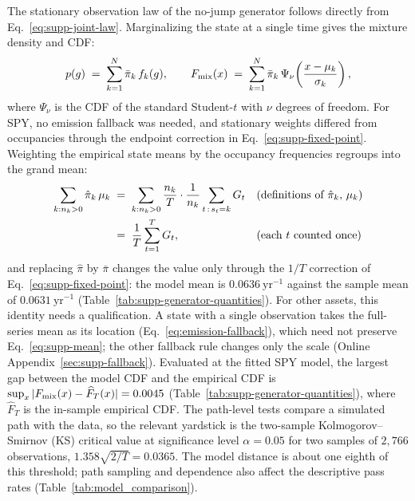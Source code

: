 The stationary observation law of the no-jump generator follows
directly from Eq.~\eqref{eq:supp-joint-law}. Marginalizing the state
at a single time gives the mixture density and CDF:
\begin{equation}
  p(g) \;=\; \sum_{k=1}^{N} \bar\pi_k\, f_k(g),
  \qquad
  F_{\rm mix}(x) \;=\; \sum_{k=1}^{N} \bar\pi_k\,
  \Psi_\nu\!\left(\frac{x - \mu_k}{\sigma_k}\right),
  \label{eq:supp-mixture}
\end{equation}
where $\Psi_\nu$ is the CDF of the standard Student-$t$ with $\nu$
degrees of freedom. For SPY, no emission fallback was needed, and stationary weights differed from occupancies through the endpoint correction in Eq.~\eqref{eq:supp-fixed-point}. Weighting the empirical state means
by the occupancy frequencies regroups into the grand mean:
\begin{align}
  \sum_{k:n_k>0} \hat\pi_k\, \mu_k
   &\;=\; \sum_{k:n_k>0} \frac{n_k}{T} \cdot \frac{1}{n_k}
     \sum_{t \,:\, s_t = k} G_t
     && \text{(definitions of $\hat\pi_k$, $\mu_k$)} \notag \\
   &\;=\; \frac{1}{T} \sum_{t=1}^{T} G_t,
     && \text{(each $t$ counted once)}
  \label{eq:supp-mean}
\end{align}
and replacing $\hat\pi$ by $\bar\pi$ changes the value only through
the $1/T$ correction of Eq.~\eqref{eq:supp-fixed-point}: the model
mean is $0.0636~\mathrm{yr}^{-1}$ against the sample mean of
$0.0631~\mathrm{yr}^{-1}$ (Table~\ref{tab:supp-generator-quantities}).
For other assets, this identity needs a qualification. A state with a
single observation takes the full-series mean as its location
(Eq.~\eqref{eq:emission-fallback}), which need not preserve
Eq.~\eqref{eq:supp-mean}; the other fallback rule changes only the
scale (Online Appendix~\ref{sec:supp-fallback}).
Evaluated at the fitted SPY model, the largest gap between the model
CDF and the empirical CDF is
$\sup_x |F_{\rm mix}(x) - \widehat F_T(x)| = 0.0045$
(Table~\ref{tab:supp-generator-quantities}), where
$\widehat F_T$ is the in-sample empirical CDF. The path-level tests
compare a simulated path with the data, so the relevant yardstick is
the two-sample Kolmogorov--Smirnov (KS) critical value at significance
level $\alpha = 0.05$ for two samples of $2{,}766$ observations,
$1.358 \sqrt{2/T} = 0.0365$. The model distance is about one eighth of this threshold; path sampling and dependence also affect the descriptive pass rates (Table~\ref{tab:model_comparison}).

